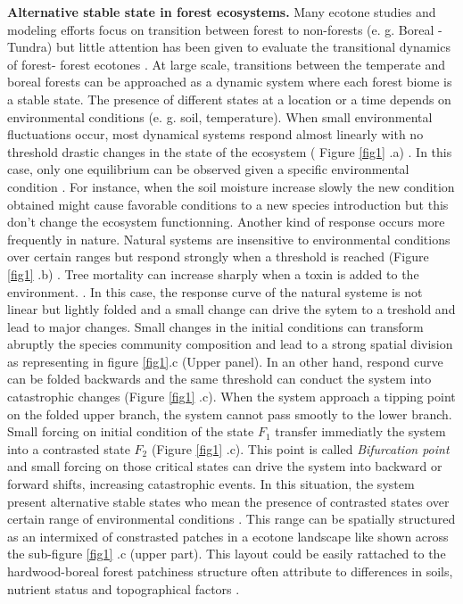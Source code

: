 \textbf{Alternative stable state in forest ecosystems.}  Many ecotone studies
and modeling efforts focus on transition between forest to non-forests (e. g.
Boreal - Tundra) \cite{Scheffer2012,Scheffer2001,Hirota2011,Messaoud2007} but
little attention has been given to evaluate the transitional dynamics of
forest- forest ecotones \cite{Goldblum2010,Graignic2013}. At large scale,
transitions between  the temperate and boreal forests can be approached as a
dynamic system where each forest biome is a stable state. The presence of
different states at a location or a time depends on environmental conditions
(e. g. soil, temperature). When small environmental fluctuations occur, most
dynamical systems respond almost linearly with no threshold drastic changes in
the state of the ecosystem ( Figure \ref{fig1} .a)
\cite{Scheffer2001,Scheffer2009}. In this case, only one equilibrium can be
observed given a specific environmental condition
\cite{Scheffer2001,Scheffer2009,scheffer2009critical}. For instance, when the
soil moisture increase slowly the new condition obtained might cause favorable
conditions to a new species introduction but this  don't change the ecosystem
functionning. Another kind of response occurs more frequently in nature.
Natural systems are insensitive to environmental conditions over certain
ranges but respond strongly when a threshold is reached (Figure \ref{fig1} .b)
\cite{scheffer2009critical}. Tree mortality can increase sharply when a toxin
is added to the environment. \cite{scheffer2009critical}. In this case, the
response curve of the natural systeme is not linear but lightly folded and a
small change can drive the sytem to a treshold and lead to major changes.
Small changes in the initial conditions can transform abruptly the species
community composition and lead to a strong spatial division as representing in
figure \ref{fig1}.c (Upper panel). In an other hand, respond curve can be
folded backwards and the same threshold can conduct the system into
catastrophic changes (Figure \ref{fig1} .c).  When the system approach a
tipping point on the folded upper branch, the system cannot pass smootly to
the lower branch. Small forcing on initial condition of the state $F_1$
transfer immediatly the system into a contrasted state $F_2$ (Figure
\ref{fig1} .c). This point is called \textit{Bifurcation point} and small
forcing on those critical states can drive the system into backward or forward
shifts, increasing catastrophic events. In this situation, the system present
alternative stable states who mean the presence of contrasted states over
certain range of environmental conditions \cite{scheffer2009critical}. This
range can be spatially structured as an intermixed of constrasted patches in a
ecotone landscape like shown across the sub-figure \ref{fig1} .c (upper part).
This layout could be easily rattached to the hardwood-boreal forest patchiness
structure often attribute to differences in soils, nutrient status and
topographical factors \cite{Society2014}.\\


